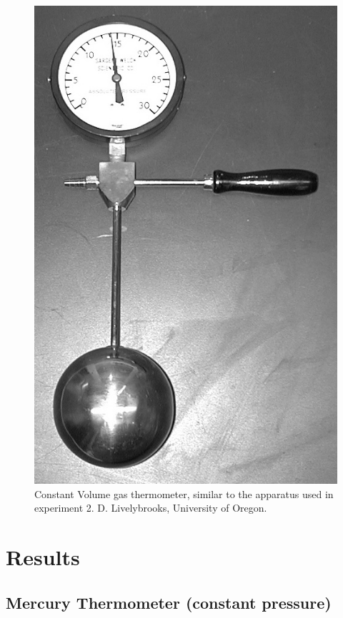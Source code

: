 \documentclass[%
 aip,
 jmp,%
 amsmath,amssymb,
 reprint,%
]{revtex4-1}
\begin{document}
  \begin{figure}[h]
    \centering
    \includegraphics[scale=.95]{const_V_thermom.jpg}
    \caption{Constant Volume gas thermometer, similar to the apparatus used in experiment 2. D. Livelybrooks, University of Oregon.}
    \label{const_V}
  \end{figure}

  \section{Results}

  \subsection{Mercury Thermometer (constant pressure)}
\end{document}
